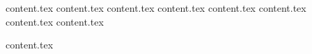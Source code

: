 \documentclass{ugent-thesis}
\begin{document}
    \makefront

    \body
    {content.tex}
    {content.tex}
    {content.tex}
    {content.tex}
    {content.tex}
    {content.tex}
    {content.tex}
    {content.tex}
    \makebibliography
    
    \appendix
    {content.tex}

    \makeback
\end{document}
